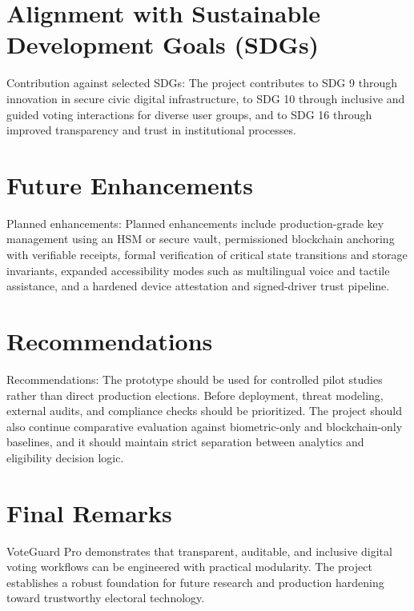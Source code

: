 \section{Alignment with Sustainable Development Goals (SDGs)}
Contribution against selected SDGs:
The project contributes to SDG 9 through innovation in secure civic digital infrastructure, to SDG 10 through inclusive and guided voting interactions for diverse user groups, and to SDG 16 through improved transparency and trust in institutional processes.

\section{Future Enhancements}
Planned enhancements:
Planned enhancements include production-grade key management using an HSM or secure vault, permissioned blockchain anchoring with verifiable receipts, formal verification of critical state transitions and storage invariants, expanded accessibility modes such as multilingual voice and tactile assistance, and a hardened device attestation and signed-driver trust pipeline.

\section{Recommendations}
Recommendations:
The prototype should be used for controlled pilot studies rather than direct production elections. Before deployment, threat modeling, external audits, and compliance checks should be prioritized. The project should also continue comparative evaluation against biometric-only and blockchain-only baselines, and it should maintain strict separation between analytics and eligibility decision logic.

\section{Final Remarks}
VoteGuard Pro demonstrates that transparent, auditable, and inclusive digital voting workflows can be engineered with practical modularity. The project establishes a robust foundation for future research and production hardening toward trustworthy electoral technology.

\clearpage
